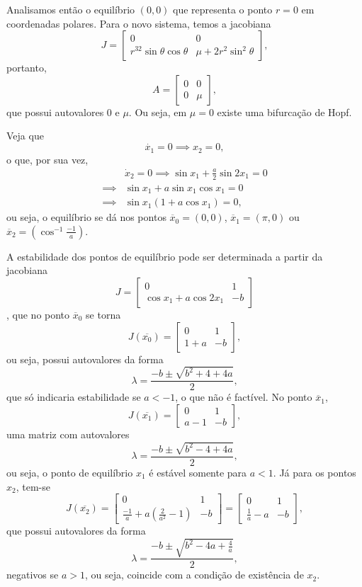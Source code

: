 \documentclass[a4paper]{report}
\begin{document}
Analisamos então o equilíbrio $(0,0)$ que representa o ponto $r=0$ em coordenadas polares. Para o novo sistema, temos a jacobiana \[
    J = \begin{bmatrix} 0 & 0 \\ r^32\sin\theta\cos\theta & \mu + 2r^2\sin^2\theta \end{bmatrix} 
,\] portanto, \[
A = \begin{bmatrix} 
    0 & 0 \\ 0 & \mu
\end{bmatrix} 
,\] que possui autovalores $0$ e $\mu$. Ou seja, em $\mu = 0$ existe uma bifurcação de Hopf.



Veja que \[
\dot{x_1} = 0 \implies x_2 = 0
,\] o que, por sua vez,
\begin{align*}
    & \dot{x}_2 = 0 \implies \sin x_1 + \frac{a}{2}\sin 2x_1 = 0 \\
    \implies & \sin x_1 + a \sin x_1 \cos x_1 = 0 \\
    \implies & \sin x_1 \left( 1 + a \cos x_1 \right) =0
,\end{align*}
ou seja, o equilíbrio se dá nos pontos $\overline{x}_0 = (0,0)$, $\overline{x}_1 = \left(\pi, 0\right)$ ou $\overline{x}_2 = \left( \cos ^{-1}\frac{-1}{a} \right) $.

A estabilidade dos pontos de equilíbrio pode ser determinada a partir da jacobiana \[
J = \begin{bmatrix} 
    0 & 1 \\
    \cos x_1 + a\cos 2x_1 & -b
\end{bmatrix} 
\], que no ponto $\overline{x}_0$ se torna \[
J(\overline{x_0}) = \begin{bmatrix} 0 & 1 \\ 1+a & -b \end{bmatrix} 
,\] ou seja, possui autovalores da forma \[
\lambda = \frac{-b \pm \sqrt{b^2 +4 +4a} }{2}
,\] que só indicaria estabilidade se $a<-1$, o que não é factível. No ponto $\overline{x}_1$,\[
J(\overline{x_1}) = \begin{bmatrix} 0 & 1 \\ a-1 & -b \end{bmatrix} 
,\] uma matriz com autovalores  \[
\lambda = \frac{-b \pm \sqrt{b^2 -4 +4a} }{2}
,\] ou seja, o ponto de equilíbrio $x_1$ é estável somente para $a<1$. Já para os pontos $x_2$, tem-se \[
J(\overline{x_2}) = \begin{bmatrix} 0 & 1 \\ \frac{-1}{a} + a\left( \frac{2}{a^2} -1 \right) & -b  \end{bmatrix} = \begin{bmatrix} 0 & 1 \\ \frac{1}{a} -a & -b \end{bmatrix} 
,\] que possui autovalores da forma \[
\lambda = \frac{-b \pm \sqrt{b^2 -4a +\frac{4}{a}} }{2}
,\] negativos se $a>1$, ou seja, coincide com a condição de existência de $x_2$.
\end{document}
